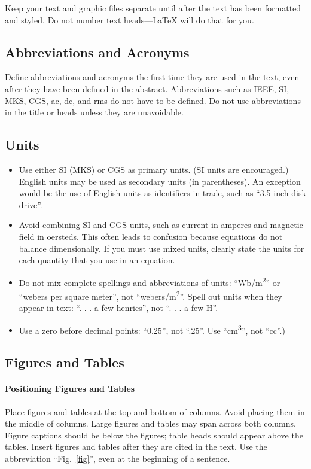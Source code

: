 \documentclass[conference]{IEEEtran}
\begin{document}
Keep your text and graphic files separate until after the text has been
formatted and styled. Do not number text heads---{\LaTeX} will do that
for you.

\subsection{Abbreviations and Acronyms}\label{AA}
Define abbreviations and acronyms the first time they are used in the text,
even after they have been defined in the abstract. Abbreviations such as
IEEE, SI, MKS, CGS, ac, dc, and rms do not have to be defined. Do not use
abbreviations in the title or heads unless they are unavoidable.

\subsection{Units}
\begin{itemize}
    \item Use either SI (MKS) or CGS as primary units. (SI units are encouraged.) English units may be used as secondary units (in parentheses). An exception would be the use of English units as identifiers in trade, such as ``3.5-inch disk drive''.
    \item Avoid combining SI and CGS units, such as current in amperes and magnetic field in oersteds. This often leads to confusion because equations do not balance dimensionally. If you must use mixed units, clearly state the units for each quantity that you use in an equation.
    \item Do not mix complete spellings and abbreviations of units: ``Wb/m\textsuperscript{2}'' or ``webers per square meter'', not ``webers/m\textsuperscript{2}''. Spell out units when they appear in text: ``. . . a few henries'', not ``. . . a few H''.
    \item Use a zero before decimal points: ``0.25'', not ``.25''. Use ``cm\textsuperscript{3}'', not ``cc''.)
\end{itemize}

\subsection{Figures and Tables}
\paragraph{Positioning Figures and Tables} Place figures and tables at the top and
bottom of columns. Avoid placing them in the middle of columns. Large
figures and tables may span across both columns. Figure captions should be
below the figures; table heads should appear above the tables. Insert
figures and tables after they are cited in the text. Use the abbreviation
``Fig.~\ref{fig}'', even at the beginning of a sentence.
\end{document}
